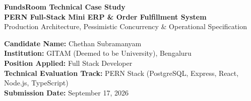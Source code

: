 \documentclass[11pt,a4paper]{article}
\begin{document}
\begin{titlepage}
    \centering
    \vspace*{1.2cm}
    
    {\Huge \textbf{\textcolor{secondary}{FundsRoom Technical Case Study}}}\\[0.4cm]
    {\LARGE \textbf{\textcolor{primary}{PERN Full-Stack Mini ERP \& Order Fulfillment System}}}\\[0.25cm]
    {\large Production Architecture, Pessimistic Concurrency \& Operational Specification}\\[1.3cm]
    
    \begin{tcolorbox}[colback=lightgray,colframe=primary,arc=3mm,width=0.94\textwidth]
        \centering
        \vspace{0.2cm}
        \textbf{Candidate Name:} Chethan Subramanyam\\[0.15cm]
        \textbf{Institution:} GITAM (Deemed to be University), Bengaluru\\[0.15cm]
        \textbf{Position Applied:} Full Stack Developer\\[0.15cm]
        \textbf{Technical Evaluation Track:} PERN Stack (PostgreSQL, Express, React, Node.js, TypeScript)\\[0.15cm]
        \textbf{Submission Date:} September 17, 2026
        \vspace{0.2cm}
    \end{tcolorbox}
    
    \vspace{1.2cm}
    

\end{titlepage}
\end{document}
